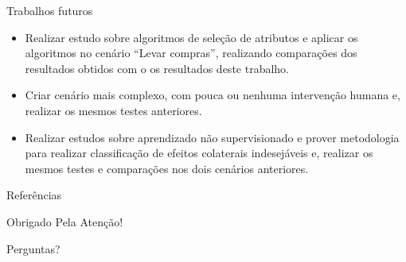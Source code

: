 \documentclass[brazil]{beamer}
\begin{document}
\begin{frame}{Trabalhos futuros}
   \begin{itemize}
\justifying
      \item <1 ->Realizar estudo sobre algoritmos de seleção de atributos e aplicar os algoritmos no cenário ``Levar compras'', realizando comparações dos resultados obtidos com o os resultados deste trabalho.
      \item <2 ->Criar cenário mais complexo, com pouca ou nenhuma intervenção humana e, realizar os mesmos testes anteriores.
      \item <3 ->Realizar estudos sobre aprendizado não supervisionado e prover metodologia para realizar classificação de efeitos colaterais indesejáveis e, realizar os mesmos testes e comparações nos dois cenários anteriores.
   \end{itemize}
\end{frame}


\begin{frame}[allowframebreaks]{Referências}
  
\end{frame}

\begin{frame}{}
\centering
\huge{Obrigado Pela Atenção!}
\end{frame}

\begin{frame}{}
\centering
\huge{Perguntas?}
\end{frame}
\end{document}
